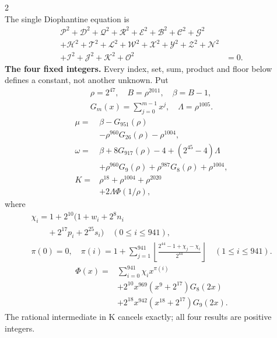 \documentclass[10pt]{article}
\newcommand{\fl}[1]{\left\lfloor#1\right\rfloor}
\begin{document}
\begin{multicols}{2}
\[\]
The single Diophantine equation is
\[
\begin{split}
\mathcal{P}^2+\mathcal{D}^2+\mathcal{Q}^2+\mathcal{R}^2+\mathcal{E}^2+\mathcal{B}^2+\mathcal{C}^2+\mathcal{G}^2 &\\
+\mathcal{H}^2+\mathcal{T}^2+\mathcal{L}^2+\mathcal{W}^2+\mathcal{X}^2+\mathcal{Y}^2+\mathcal{Z}^2+\mathcal{N}^2 &\\
+\mathcal{I}^2+\mathcal{J}^2+\mathcal{K}^2+\mathcal{O}^2 &= 0.
\end{split}
\]
\textbf{The four fixed integers.}
Every index, set, sum, product and floor below defines a constant, not
another unknown. Put
\[
\begin{gathered}
\rho=2^{47},\quad B=\rho^{2011},\quad\beta=B-1,\\
G_m(x)=\sum_{j=0}^{m-1}x^j,\quad
\Lambda=\rho^{1005}.
\end{gathered}
\]
\begin{align*}
\mu={}&\beta-G_{951}(\rho)\\
&-\rho^{960}G_{26}(\rho)-\rho^{1004},\\
\omega={}&\beta+8G_{917}(\rho)-4+(2^{45}-4)\Lambda\\
&+\rho^{960}G_9(\rho)+\rho^{987}G_8(\rho)
  +\rho^{1004},\\
K={}&\rho^{18}+\rho^{1004}+\rho^{2020}\\
&+2\Lambda\Phi(1/\rho),
\end{align*}
where
\[
\begin{gathered}
\chi_i=1+2^{10}(1+w_i+2^8n_i\\
\qquad+2^{17}p_i+2^{25}s_i)\quad(0\le i\le941),\\
\pi(0)=0,\quad\pi(i)=1+\sum_{j=1}^{941}
\fl{\frac{2^{44}-1+\chi_j-\chi_i}{2^{44}}}\quad(1\le i\le941).
\end{gathered}
\]
\[
\begin{split}
\Phi(x)={}&\sum_{i=0}^{941}\chi_i x^{\pi(i)}\\
&+2^{10}x^{969}(x^9+2^{17})G_8(2x)\\
&+2^{18}x^{942}(x^{18}+2^{17})G_9(2x).
\end{split}
\]
The rational intermediate in K cancels exactly; all four results are positive integers.


\end{multicols}
\end{document}
